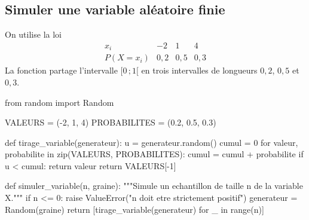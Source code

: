 \subsection{Simuler une variable aléatoire finie}

On utilise la loi
\[
\begin{array}{c|ccc}
  x_i & -2 & 1 & 4\\ \hline
  P(X=x_i) & 0{,}2 & 0{,}5 & 0{,}3
\end{array}
\]
La fonction  partage l'intervalle $[0\,;1[$ en
trois intervalles de longueurs $0{,}2$, $0{,}5$ et $0{,}3$.

\begin{python}
from random import Random

VALEURS = (-2, 1, 4)
PROBABILITES = (0.2, 0.5, 0.3)

def tirage_variable(generateur):
    u = generateur.random()
    cumul = 0
    for valeur, probabilite in zip(VALEURS, PROBABILITES):
        cumul = cumul + probabilite
        if u < cumul:
            return valeur
    return VALEURS[-1]

def simuler_variable(n, graine):
    """Simule un echantillon de taille n de la variable X."""
    if n <= 0:
        raise ValueError("n doit etre strictement positif")
    generateur = Random(graine)
    return [tirage_variable(generateur) for _ in range(n)]
\end{python}

